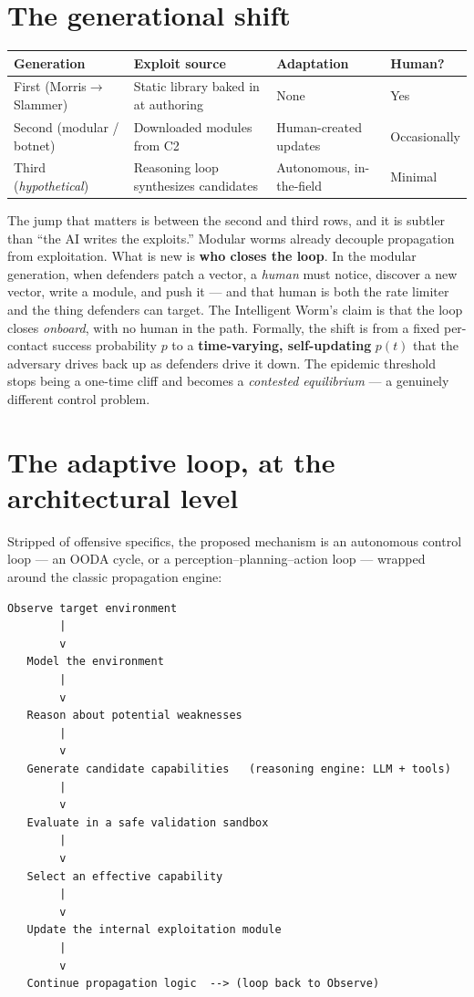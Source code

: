 \documentclass[11pt,a4paper]{article}
\begin{document}
\section{The generational shift}

\begin{center}
\small
\begin{tabularx}{\linewidth}{@{}l X X l@{}}
\toprule
\textbf{Generation} & \textbf{Exploit source} & \textbf{Adaptation} & \textbf{Human?} \\
\midrule
First (Morris$\to$Slammer) & Static library baked in at authoring & None & Yes \\
Second (modular / botnet) & Downloaded modules from C2 & Human-created updates & Occasionally \\
Third (\emph{hypothetical}) & Reasoning loop synthesizes candidates & Autonomous, in-the-field & Minimal \\
\bottomrule
\end{tabularx}
\end{center}

The jump that matters is between the second and third rows, and it is subtler than ``the AI writes the exploits.'' Modular worms already decouple propagation from exploitation. What is new is \textbf{who closes the loop}. In the modular generation, when defenders patch a vector, a \emph{human} must notice, discover a new vector, write a module, and push it --- and that human is both the rate limiter and the thing defenders can target. The Intelligent Worm's claim is that the loop closes \emph{onboard}, with no human in the path. Formally, the shift is from a fixed per-contact success probability $p$ to a \textbf{time-varying, self-updating} $p(t)$ that the adversary drives back up as defenders drive it down. The epidemic threshold stops being a one-time cliff and becomes a \emph{contested equilibrium} --- a genuinely different control problem.

\section{The adaptive loop, at the architectural level}

Stripped of offensive specifics, the proposed mechanism is an autonomous control loop --- an OODA cycle, or a perception--planning--action loop --- wrapped around the classic propagation engine:

\begin{Verbatim}[frame=single,fontsize=\small]
   Observe target environment
        |
        v
   Model the environment
        |
        v
   Reason about potential weaknesses
        |
        v
   Generate candidate capabilities   (reasoning engine: LLM + tools)
        |
        v
   Evaluate in a safe validation sandbox
        |
        v
   Select an effective capability
        |
        v
   Update the internal exploitation module
        |
        v
   Continue propagation logic  --> (loop back to Observe)
\end{Verbatim}
\end{document}
